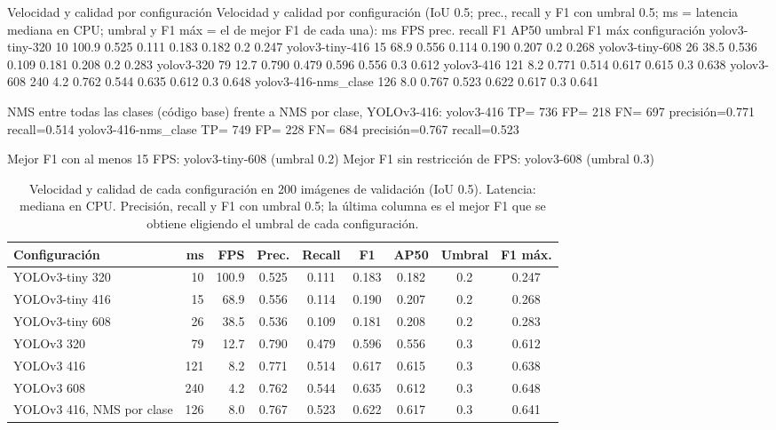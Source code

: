 \documentclass[11pt,letterpaper]{article}
\begin{document}
\begin{consola}[label=out:t1]{Velocidad y calidad por configuración}
Velocidad y calidad por configuración (IoU 0.5; prec., recall y F1 con umbral 0.5;
ms = latencia mediana en CPU; umbral y F1 máx = el de mejor F1 de cada una):
                       ms    FPS  prec.  recall     F1   AP50  umbral  F1 máx
configuración
yolov3-tiny-320        10  100.9  0.525   0.111  0.183  0.182     0.2   0.247
yolov3-tiny-416        15   68.9  0.556   0.114  0.190  0.207     0.2   0.268
yolov3-tiny-608        26   38.5  0.536   0.109  0.181  0.208     0.2   0.283
yolov3-320             79   12.7  0.790   0.479  0.596  0.556     0.3   0.612
yolov3-416            121    8.2  0.771   0.514  0.617  0.615     0.3   0.638
yolov3-608            240    4.2  0.762   0.544  0.635  0.612     0.3   0.648
yolov3-416-nms_clase  126    8.0  0.767   0.523  0.622  0.617     0.3   0.641

NMS entre todas las clases (código base) frente a NMS por clase, YOLOv3-416:
  yolov3-416             TP= 736  FP= 218  FN= 697  precisión=0.771  recall=0.514
  yolov3-416-nms_clase   TP= 749  FP= 228  FN= 684  precisión=0.767  recall=0.523

Mejor F1 con al menos 15 FPS: yolov3-tiny-608 (umbral 0.2)
Mejor F1 sin restricción de FPS: yolov3-608 (umbral 0.3)
\end{consola}

\begin{table}[H]
\centering
\caption{Velocidad y calidad de cada configuración en 200 imágenes de validación (IoU 0.5). Latencia: mediana en CPU. Precisión, recall y F1 con umbral 0.5; la última columna es el mejor F1 que se obtiene eligiendo el umbral de cada configuración.}
\label{tab:t1}
\small
\begin{tabular}{lrrcccccc}
\toprule
\textbf{Configuración} & \textbf{ms} & \textbf{FPS} & \textbf{Prec.} & \textbf{Recall} & \textbf{F1} & \textbf{AP50} & \textbf{Umbral} & \textbf{F1 máx.} \\
\midrule
YOLOv3-tiny 320 & 10 & 100.9 & 0.525 & 0.111 & 0.183 & 0.182 & 0.2 & 0.247 \\
YOLOv3-tiny 416 & 15 & 68.9 & 0.556 & 0.114 & 0.190 & 0.207 & 0.2 & 0.268 \\
YOLOv3-tiny 608 & 26 & 38.5 & 0.536 & 0.109 & 0.181 & 0.208 & 0.2 & 0.283 \\
YOLOv3 320 & 79 & 12.7 & 0.790 & 0.479 & 0.596 & 0.556 & 0.3 & 0.612 \\
YOLOv3 416 & 121 & 8.2 & 0.771 & 0.514 & 0.617 & 0.615 & 0.3 & 0.638 \\
YOLOv3 608 & 240 & 4.2 & 0.762 & 0.544 & 0.635 & 0.612 & 0.3 & 0.648 \\
YOLOv3 416, NMS por clase & 126 & 8.0 & 0.767 & 0.523 & 0.622 & 0.617 & 0.3 & 0.641 \\
\bottomrule
\end{tabular}
\end{table}
\end{document}
